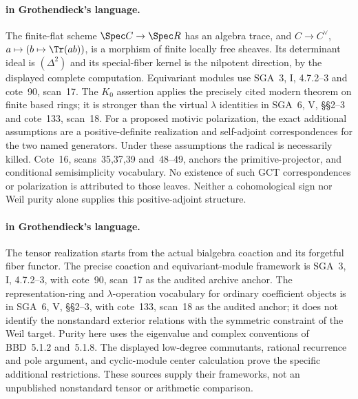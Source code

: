 \paragraph{ in Grothendieck's language.}
The finite-flat scheme $\Spec C\to\Spec R$ has an algebra trace,
and $C\to C^\vee$, $a\mapsto(b\mapsto\Tr(ab))$, is a morphism
of finite locally free sheaves. Its determinant ideal is
$(\Delta^2)$ and its special-fiber kernel is the nilpotent
direction, by the displayed complete computation. Equivariant
modules use SGA~3, I, 4.7.2--3 and cote~90, scan~17.
The $K_0$ assertion applies the precisely cited modern theorem
on finite based rings; it is stronger than the virtual
$\lambda$ identities in SGA~6, V, \S\S2--3 and cote~133,
scan~18. For a proposed motivic polarization, the exact
additional assumptions are a positive-definite realization and
self-adjoint correspondences for the two named generators.
Under these assumptions the radical is necessarily killed.
Cote~16, scans~35,37,39 and~48--49, anchors the primitive-projector,
and conditional semisimplicity vocabulary. No
existence of such GCT correspondences or polarization is
attributed to those leaves. Neither a cohomological sign nor
Weil purity alone supplies this positive-adjoint structure.



\paragraph{ in Grothendieck's language.}
The tensor realization starts from the actual bialgebra
coaction and its forgetful fiber functor. The precise
coaction and equivariant-module framework is SGA~3,
I, 4.7.2--3, with cote~90, scan~17 as the audited archive
anchor. The representation-ring and $\lambda$-operation
vocabulary for ordinary coefficient objects is in
SGA~6, V, \S\S2--3, with cote~133, scan~18 as the audited anchor;
it does not identify the nonstandard exterior relations
with the symmetric constraint of the Weil target.
Purity here uses the eigenvalue and complex conventions
of BBD~5.1.2 and~5.1.8.
The displayed low-degree commutants, rational recurrence
and pole argument, and cyclic-module center calculation
prove the specific additional restrictions.
These sources supply their frameworks, not an unpublished
nonstandard tensor or arithmetic comparison.



